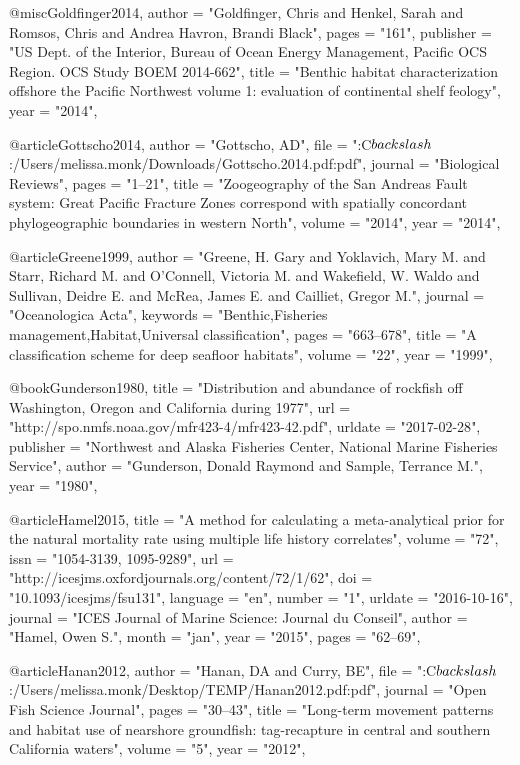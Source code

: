 @misc{Goldfinger2014,
    author = "{Goldfinger, Chris and Henkel, Sarah and Romsos, Chris and {Andrea Havron}, Brandi Black}",
    pages = "{161}",
    publisher = "{US Dept. of the Interior, Bureau of Ocean Energy Management, Pacific OCS Region. OCS Study BOEM 2014-662}",
    title = "{{Benthic habitat characterization offshore the Pacific Northwest volume 1: evaluation of continental shelf feology}}",
    year = "{2014}",
}

@article{Gottscho2014,
    author = "{Gottscho, AD}",
    file = "{:C$\\backslash$:/Users/melissa.monk/Downloads/Gottscho.2014.pdf:pdf}",
    journal = "{Biological Reviews}",
    pages = "{1--21}",
    title = "{{Zoogeography of the San Andreas Fault system: Great Pacific Fracture Zones correspond with spatially concordant phylogeographic boundaries in western North}}",
    volume = "{2014}",
    year = "{2014}",
}

@article{Greene1999,
    author = "{Greene, H. Gary and Yoklavich, Mary M. and Starr, Richard M. and O'Connell, Victoria M. and Wakefield, W. Waldo and Sullivan, Deidre E. and McRea, James E. and Cailliet, Gregor M.}",
    journal = "{Oceanologica Acta}",
    keywords = "{Benthic,Fisheries management,Habitat,Universal classification}",
    pages = "{663--678}",
    title = "{{A classification scheme for deep seafloor habitats}}",
    volume = "{22}",
    year = "{1999}",
}

@book{Gunderson1980,
    title = "{Distribution and abundance of rockfish off {Washington}, {Oregon} and {California} during 1977}",
    url = "{http://spo.nmfs.noaa.gov/mfr423-4/mfr423-42.pdf}",
    urldate = "{2017-02-28}",
    publisher = "{Northwest and Alaska Fisheries Center, National Marine Fisheries Service}",
    author = "{Gunderson, Donald Raymond and Sample, Terrance M.}",
    year = "{1980}",
}

@article{Hamel2015,
    title = "{A method for calculating a meta-analytical prior for the natural mortality rate using multiple life history correlates}",
    volume = "{72}",
    issn = "{1054-3139, 1095-9289}",
    url = "{http://icesjms.oxfordjournals.org/content/72/1/62}",
    doi = "{10.1093/icesjms/fsu131}",
    language = "{en}",
    number = "{1}",
    urldate = "{2016-10-16}",
    journal = "{ICES Journal of Marine Science: Journal du Conseil}",
    author = "{Hamel, Owen S.}",
    month = "jan",
    year = "{2015}",
    pages = "{62--69}",
}

@article{Hanan2012,
    author = "{Hanan, DA and Curry, BE}",
    file = "{:C$\\backslash$:/Users/melissa.monk/Desktop/TEMP/Hanan2012.pdf:pdf}",
    journal = "{Open Fish Science Journal}",
    pages = "{30--43}",
    title = "{{Long-term movement patterns and habitat use of nearshore groundfish: tag-recapture in central and southern California waters}}",
    volume = "{5}",
    year = "{2012}",
}

